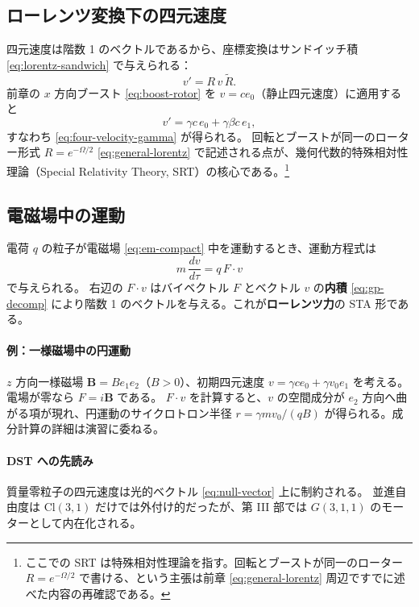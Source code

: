 \documentclass[dvipdfmx,a4paper,oneside]{jsbook}
\numberwithin{equation}{chapter}
\begin{document}
\subsection{ローレンツ変換下の四元速度}

四元速度は階数 1 のベクトルであるから、座標変換はサンドイッチ積 \eqref{eq:lorentz-sandwich} で与えられる：
\begin{equation}
  v' = R\,v\,\widetilde{R}.
  \label{eq:four-velocity-transform}
\end{equation}
前章の \(x\) 方向ブースト \eqref{eq:boost-rotor} を \(v = c e_0\)（静止四元速度）に適用すると
\begin{equation}
  v' = \gamma c\, e_0 + \gamma \beta c\, e_1,
  \label{eq:boost-four-velocity}
\end{equation}
すなわち \eqref{eq:four-velocity-gamma} が得られる。
回転とブーストが同一のローター形式 \(R=e^{-\Omega/2}\) \eqref{eq:general-lorentz} で記述される点が、幾何代数的特殊相対性理論（Special Relativity Theory, SRT）の核心である。\footnote{ここでの SRT は特殊相対性理論を指す。回転とブーストが同一のローター \(R=e^{-\Omega/2}\) で書ける、という主張は前章 \eqref{eq:general-lorentz} 周辺ですでに述べた内容の再確認である。}

\subsection{電磁場中の運動}

電荷 \(q\) の粒子が電磁場 \eqref{eq:em-compact} 中を運動するとき、運動方程式は
\begin{equation}
  m\,\frac{dv}{d\tau} = q\, F\cdot v
  \label{eq:lorentz-force}
\end{equation}
で与えられる。
右辺の \(F\cdot v\) はバイベクトル \(F\) とベクトル \(v\) の\textbf{内積} \eqref{eq:gp-decomp} により階数 1 のベクトルを与える。これが\textbf{ローレンツ力}の STA 形である。

\paragraph{例：一様磁場中の円運動}
\(z\) 方向一様磁場 \(\mathbf{B} = B e_1 e_2\)（\(B>0\)）、初期四元速度 \(v = \gamma c e_0 + \gamma v_0 e_1\) を考える。
電場が零なら \(F = i\mathbf{B}\) である。
\(F\cdot v\) を計算すると、\(v\) の空間成分が \(e_2\) 方向へ曲がる項が現れ、円運動のサイクロトロン半径 \(r = \gamma m v_0 / (qB)\) が得られる。成分計算の詳細は演習に委ねる。

\paragraph{DST への先読み}
質量零粒子の四元速度は光的ベクトル \eqref{eq:null-vector} 上に制約される。
並進自由度は \(\mathrm{Cl}(3,1)\) だけでは外付け的だったが、第 III 部では \(G(3,1,1)\) のモーターとして内在化される。
\end{document}
